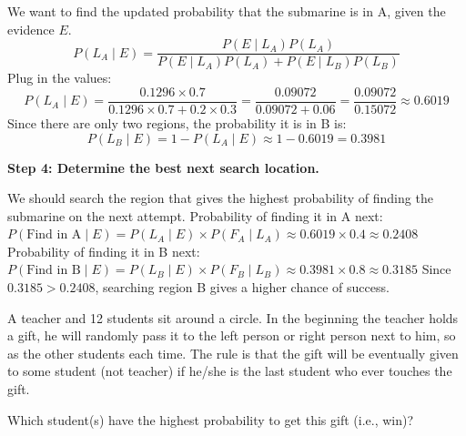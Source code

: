 \begin{solution}
We want to find the updated probability that the submarine is in A, given the evidence $E$.
\[ P(L_A \mid E) = \frac{P(E \mid L_A)P(L_A)}{P(E \mid L_A)P(L_A) + P(E \mid L_B)P(L_B)} \]
Plug in the values:
\[ P(L_A \mid E) = \frac{0.1296 \times 0.7}{0.1296 \times 0.7 + 0.2 \times 0.3} = \frac{0.09072}{0.09072 + 0.06} = \frac{0.09072}{0.15072} \approx 0.6019 \]
Since there are only two regions, the probability it is in B is:
\[ P(L_B \mid E) = 1 - P(L_A \mid E) \approx 1 - 0.6019 = 0.3981 \]

\textbf{Step 4: Determine the best next search location.}

We should search the region that gives the highest probability of finding the submarine on the next attempt.
Probability of finding it in A next: $P(\text{Find in A} \mid E) = P(L_A \mid E) \times P(F_A \mid L_A) \approx 0.6019 \times 0.4 \approx 0.2408$
Probability of finding it in B next: $P(\text{Find in B} \mid E) = P(L_B \mid E) \times P(F_B \mid L_B) \approx 0.3981 \times 0.8 \approx 0.3185$
Since $0.3185 > 0.2408$, searching region B gives a higher chance of success.
\end{solution}

\begin{exercise}\label{probability:2017:2}
A teacher and 12 students sit around a circle. In the beginning the teacher holds a gift, he will randomly pass it to the left person or right person next to him, so as the other students each time. The rule is that the gift will be eventually given to some student (not teacher) if he/she is the last student who ever touches the gift.

Which student(s) have the highest probability to get this gift (i.e., win)?
\end{exercise}

